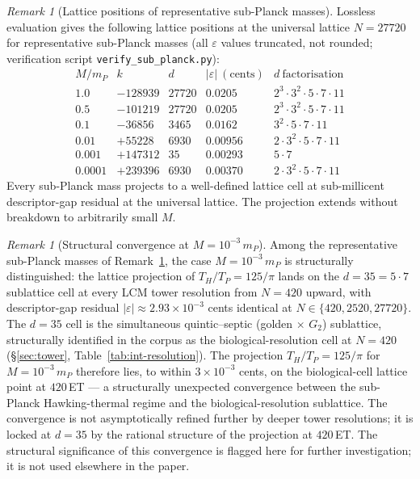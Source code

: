 \documentclass[11pt,a4paper]{article}
\theoremstyle{definition}
\theoremstyle{remark}
\newtheorem{remark}[theorem]{Remark}
\begin{document}
\begin{remark}[Lattice positions of representative sub-Planck masses]\label{rem:subplanck-table}
Lossless evaluation gives the following lattice positions at the universal lattice $N = 27720$ for representative sub-Planck masses (all $\varepsilon$ values truncated, not rounded; verification script \texttt{verify\_sub\_planck.py}):
\[
\begin{array}{r|c|c|c|l}
M/m_{P} & k & d & |\varepsilon|~(\text{cents}) & d~\text{factorisation}\\ \hline
1.0 & -128939 & 27720 & 0.0205 & 2^{3}\!\cdot\!3^{2}\!\cdot\!5\!\cdot\!7\!\cdot\!11 \\
0.5 & -101219 & 27720 & 0.0205 & 2^{3}\!\cdot\!3^{2}\!\cdot\!5\!\cdot\!7\!\cdot\!11 \\
0.1 & -36856 & 3465 & 0.0162 & 3^{2}\!\cdot\!5\!\cdot\!7\!\cdot\!11 \\
0.01 & +55228 & 6930 & 0.00956 & 2\!\cdot\!3^{2}\!\cdot\!5\!\cdot\!7\!\cdot\!11 \\
0.001 & +147312 & 35 & 0.00293 & 5\!\cdot\!7 \\
0.0001 & +239396 & 6930 & 0.00370 & 2\!\cdot\!3^{2}\!\cdot\!5\!\cdot\!7\!\cdot\!11
\end{array}
\]
Every sub-Planck mass projects to a well-defined lattice cell at sub-millicent descriptor-gap residual at the universal lattice. The projection extends without breakdown to arbitrarily small $M$.
\end{remark}

\begin{remark}[Structural convergence at $M = 10^{-3}\,m_{P}$]\label{rem:subplanck-convergence}
Among the representative sub-Planck masses of Remark~\ref{rem:subplanck-table}, the case $M = 10^{-3}\,m_{P}$ is structurally distinguished: the lattice projection of $T_{H}/T_{P} = 125/\pi$ lands on the $d = 35 = 5 \cdot 7$ sublattice cell at every LCM tower resolution from $N = 420$ upward, with descriptor-gap residual $|\varepsilon| \approx 2.93 \times 10^{-3}$ cents identical at $N \in \{420, 2520, 27720\}$. The $d = 35$ cell is the simultaneous quintic--septic (golden $\times$ $G_{2}$) sublattice, structurally identified in the corpus as the biological-resolution cell at $N = 420$ (\S\ref{sec:tower}, Table~\ref{tab:int-resolution}). The projection $T_{H}/T_{P} = 125/\pi$ for $M = 10^{-3}\,m_{P}$ therefore lies, to within $3 \times 10^{-3}$ cents, on the biological-cell lattice point at $420$\,ET --- a structurally unexpected convergence between the sub-Planck Hawking-thermal regime and the biological-resolution sublattice. The convergence is not asymptotically refined further by deeper tower resolutions; it is locked at $d = 35$ by the rational structure of the projection at $420$\,ET. The structural significance of this convergence is flagged here for further investigation; it is not used elsewhere in the paper.
\end{remark}
\end{document}
